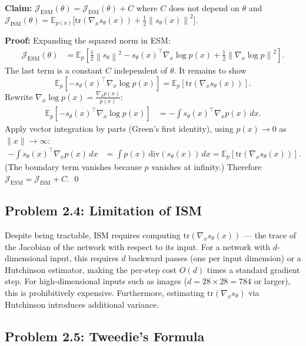\documentclass[11pt]{article}
\newcommand{\E}{\mathbb{E}}
\newcommand{\norm}[1]{\left\|#1\right\|}
\newcommand{\sth}{s_\theta}
\begin{document}
\textbf{Claim:} $\mathcal{J}_\mathrm{ESM}(\theta) = \mathcal{J}_\mathrm{ISM}(\theta) + C$
where $C$ does not depend on $\theta$ and
$\mathcal{J}_\mathrm{ISM}(\theta)
= \E_{p(x)}\!\bigl[\mathrm{tr}(\nabla_x\sth(x)) + \tfrac{1}{2}\norm{\sth(x)}^2\bigr]$.

\textbf{Proof:} Expanding the squared norm in ESM:
\begin{align*}
\mathcal{J}_\mathrm{ESM}(\theta)
&= \E_p\!\left[\tfrac{1}{2}\norm{\sth}^2
   - \sth(x)^\top\nabla_x\log p(x)
   + \tfrac{1}{2}\norm{\nabla_x\log p}^2\right].
\end{align*}
The last term is a constant $C$ independent of $\theta$. It remains to show
\[
\E_p\!\left[-\sth(x)^\top\nabla_x\log p(x)\right]
= \E_p\!\left[\mathrm{tr}(\nabla_x\sth(x))\right].
\]
Rewrite $\nabla_x\log p(x) = \frac{\nabla_x p(x)}{p(x)}$:
\begin{align*}
\E_p\!\left[-\sth(x)^\top\nabla_x\log p(x)\right]
&= -\int \sth(x)^\top\nabla_x p(x)\,dx.
\end{align*}
Apply vector integration by parts (Green's first identity), using $p(x)\to 0$ as $\|x\|\to\infty$:
\begin{align*}
-\int \sth(x)^\top\nabla_x p(x)\,dx
&= \int p(x)\,\mathrm{div}(\sth(x))\,dx
 = \E_p\!\left[\mathrm{tr}(\nabla_x\sth(x))\right].
\end{align*}
(The boundary term vanishes because $p$ vanishes at infinity.)
Therefore $\mathcal{J}_\mathrm{ESM} = \mathcal{J}_\mathrm{ISM} + C$. \qed

\subsection{Problem 2.4: Limitation of ISM}

Despite being tractable, ISM requires computing $\mathrm{tr}(\nabla_x\sth(x))$
--- the trace of the Jacobian of the network with respect to its input.  For a
network with $d$-dimensional input, this requires $d$ backward passes (one per
input dimension) or a Hutchinson estimator, making the per-step cost $O(d)$
times a standard gradient step.  For high-dimensional inputs such as images
($d=28\times28=784$ or larger), this is prohibitively expensive.  Furthermore,
estimating $\mathrm{tr}(\nabla_x\sth)$ via Hutchinson introduces additional
variance.

\subsection{Problem 2.5: Tweedie's Formula}
\end{document}
